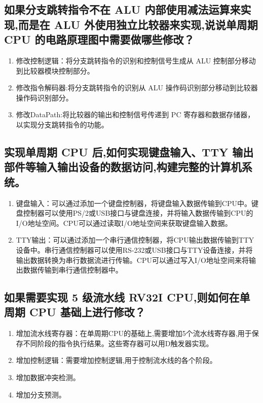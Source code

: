 \documentclass{article}
\begin{document}
    \subsection{如果分支跳转指令不在 ALU 内部使用减法运算来实现,而是在 ALU 外使用独立比较器来实现,说说单周期 CPU 的电路原理图中需要做哪些修改？}
    \begin{enumerate}
        \item 修改控制逻辑：将分支跳转指令的识别和控制信号生成从 ALU 控制部分移动到比较器模块控制部分。
        \item 修改指令解码器:将分支跳转指令的识别从 ALU 操作码识别部分移动到比较器操作码识别部分。
        \item 修改DataPath:将比较器的输出和控制信号传递到 PC 寄存器和数据存储器，以实现分支跳转指令的功能。
    \end{enumerate}



    \subsection{实现单周期 CPU 后,如何实现键盘输入、TTY 输出部件等输入输出设备的数据访问,构建完整的计算机系统。}
    \begin{enumerate}
        \item 键盘输入：可以通过添加一个键盘控制器，将键盘输入数据传输到CPU中。键盘控制器可以使用PS/2或USB接口与键盘连接，并将输入数据传输到CPU的I/O地址空间。CPU可以通过读取I/O地址空间来获取键盘输入数据。
        \item TTY输出：可以通过添加一个串行通信控制器，将CPU输出数据传输到TTY设备中。串行通信控制器可以使用RS-232或USB接口与TTY设备连接，并将输出数据转换为串行数据流进行传输。CPU可以通过写入I/O地址空间来将输出数据传输到串行通信控制器中。
    \end{enumerate}


    \subsection{如果需要实现 5 级流水线 RV32I CPU,则如何在单周期 CPU 基础上进行修改？}
    \begin{enumerate}
        \item 增加流水线寄存器：在单周期CPU的基础上,需要增加5个流水线寄存器,用于保存不同阶段的指令执行结果。这些寄存器可以用D触发器实现。
        \item 增加控制逻辑：需要增加控制逻辑,用于控制流水线的各个阶段。
        \item 增加数据冲突检测。
        \item 增加分支预测。
    \end{enumerate}
    
\end{document}
